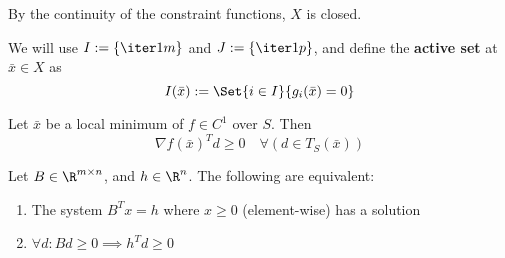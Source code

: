 By the continuity of the constraint functions, $X$ is closed.

We will use $I:=\{\iter1m\}$ and $J:=\{\iter1p\}$, and define the
\textbf{active set} at $\bar x\in X$ as
$$
	I(\bar x):=\Set{i\in I}{g_i(\bar x)=0}
$$

\label{c8e5836}

Let $\bar x$ be a local minimum of $f\in C^1$ over $S$. Then
$$
	\nabla f(\bar x)^Td\geq0\quad\forall(d\in T_S(\bar x))
$$

\label{d64b0db}

Let $B\in\R^{m\times n}$, and $h\in\R^n$. The following are equivalent:
\begin{enumerate}
	\item The system $B^Tx=h$ where $x\geq0$ (element-wise) has a solution
	\item $\forall d: Bd\geq0\implies h^Td\geq0$
\end{enumerate}

